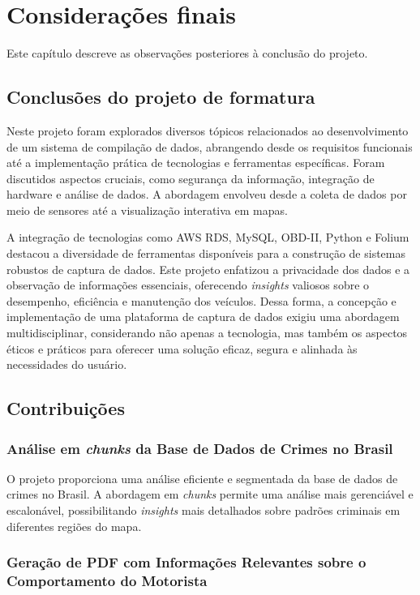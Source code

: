 \chapter{Considerações finais}

Este capítulo descreve as observações posteriores à conclusão do projeto.

\section{Conclusões do projeto de formatura}
Neste projeto foram explorados diversos tópicos relacionados ao desenvolvimento de um sistema de compilação de dados, abrangendo desde os requisitos funcionais até a implementação prática de tecnologias e ferramentas específicas. Foram discutidos aspectos cruciais, como segurança da informação, integração de hardware e análise de dados. A abordagem envolveu desde a coleta de dados por meio de sensores até a visualização interativa em mapas. 

A integração de tecnologias como AWS RDS, MySQL, OBD-II, Python e Folium destacou a diversidade de ferramentas disponíveis para a construção de sistemas robustos de captura de dados. Este projeto enfatizou a privacidade dos dados e a  observação de informações essenciais, oferecendo \textit{insights} valiosos sobre o desempenho, eficiência e manutenção dos veículos. Dessa forma, a concepção e implementação de uma plataforma de captura de dados exigiu uma abordagem multidisciplinar, considerando não apenas a tecnologia, mas também os aspectos éticos e práticos para oferecer uma solução eficaz, segura e alinhada às necessidades do usuário.

\section{Contribuições}
\subsection{Análise em \textit{chunks} da Base de Dados de Crimes no Brasil}

O projeto proporciona uma análise eficiente e segmentada da base de dados de crimes no Brasil. A abordagem em \textit{chunks} permite uma análise mais gerenciável e escalonável, possibilitando \textit{insights} mais detalhados sobre padrões criminais em diferentes regiões do mapa.

\subsection{Geração de PDF com Informações Relevantes sobre o Comportamento do Motorista}

